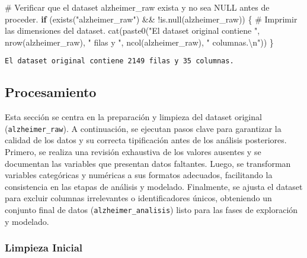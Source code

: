 \documentclass[
  letterpaper,
  DIV=11,
  numbers=noendperiod]{scrartcl}
\newenvironment{Shaded}{\begin{snugshade}}{\end{snugshade}}
\newcommand{\CommentTok}[1]{\textcolor[rgb]{0.37,0.37,0.37}{#1}}
\newcommand{\ControlFlowTok}[1]{\textcolor[rgb]{0.00,0.23,0.31}{\textbf{#1}}}
\newcommand{\FunctionTok}[1]{\textcolor[rgb]{0.28,0.35,0.67}{#1}}
\newcommand{\NormalTok}[1]{\textcolor[rgb]{0.00,0.23,0.31}{#1}}
\newcommand{\SpecialCharTok}[1]{\textcolor[rgb]{0.37,0.37,0.37}{#1}}
\newcommand{\StringTok}[1]{\textcolor[rgb]{0.13,0.47,0.30}{#1}}
\begin{document}
\begin{Shaded}
\begin{Highlighting}[]
\CommentTok{\# Verificar que el dataset \textquotesingle{}alzheimer\_raw\textquotesingle{} exista y no sea NULL antes de proceder.}
\ControlFlowTok{if}\NormalTok{ (}\FunctionTok{exists}\NormalTok{(}\StringTok{"alzheimer\_raw"}\NormalTok{) }\SpecialCharTok{\&\&} \SpecialCharTok{!}\FunctionTok{is.null}\NormalTok{(alzheimer\_raw)) \{}
  \CommentTok{\# Imprimir las dimensiones del dataset.}
  \FunctionTok{cat}\NormalTok{(}\FunctionTok{paste0}\NormalTok{(}\StringTok{"El dataset original contiene "}\NormalTok{, }\FunctionTok{nrow}\NormalTok{(alzheimer\_raw), }\StringTok{" filas y "}\NormalTok{,}
      \FunctionTok{ncol}\NormalTok{(alzheimer\_raw), }\StringTok{" columnas.}\SpecialCharTok{\textbackslash{}n}\StringTok{"}\NormalTok{))}
\NormalTok{\}}
\end{Highlighting}
\end{Shaded}

\begin{verbatim}
El dataset original contiene 2149 filas y 35 columnas.
\end{verbatim}

\subsection{Procesamiento}\label{procesamiento}

Esta sección se centra en la preparación y limpieza del dataset original
(\texttt{alzheimer\_raw}). A continuación, se ejecutan pasos clave para
garantizar la calidad de los datos y su correcta tipificación antes de
los análisis posteriores. Primero, se realiza una revisión exhaustiva de
los valores ausentes y se documentan las variables que presentan datos
faltantes. Luego, se transforman variables categóricas y numéricas a sus
formatos adecuados, facilitando la consistencia en las etapas de
análisis y modelado. Finalmente, se ajusta el dataset para excluir
columnas irrelevantes o identificadores únicos, obteniendo un conjunto
final de datos (\texttt{alzheimer\_analisis}) listo para las fases de
exploración y modelado.

\subsubsection{Limpieza Inicial}\label{limpieza-inicial}
\end{document}
